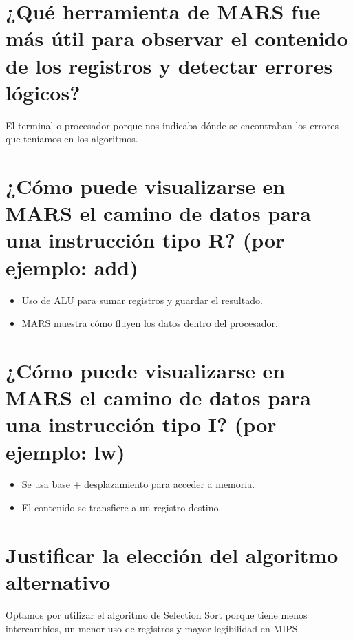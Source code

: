 \documentclass[12pt]{article}
\begin{document}
\section{¿Qué herramienta de MARS fue más útil para observar el contenido de los registros y 
detectar errores lógicos?}
\begin{itemize}
    El terminal o procesador porque nos indicaba dónde se encontraban los errores que teníamos en los algoritmos.
\end{itemize}

\section{¿Cómo puede visualizarse en MARS el camino de datos para una instrucción tipo R?
(por ejemplo: add)}
\begin{itemize}
    \item Uso de ALU para sumar registros y guardar el resultado.
    \item MARS muestra cómo fluyen los datos dentro del procesador.
\end{itemize}

\section{¿Cómo puede visualizarse en MARS el camino de datos para una instrucción tipo I? (por 
ejemplo: lw)}
\begin{itemize}
    \item Se usa base + desplazamiento para acceder a memoria.
    \item El contenido se transfiere a un registro destino.
\end{itemize}

\section{Justificar la elección del algoritmo alternativo}
\begin{itemize}
    Optamos por utilizar el algoritmo de Selection Sort porque tiene menos intercambios, un menor uso de registros y mayor legibilidad en MIPS.
\end{itemize}
\end{document}

